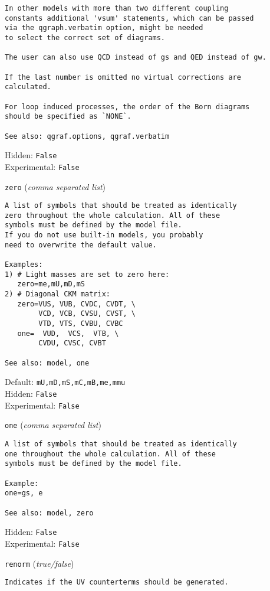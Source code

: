 \begin{basedescript}{\desclabelstyle{\pushlabel}}
\begin{verbatim}
In other models with more than two different coupling
constants additional 'vsum' statements, which can be passed
via the qgraph.verbatim option, might be needed
to select the correct set of diagrams.

The user can also use QCD instead of gs and QED instead of gw.

If the last number is omitted no virtual corrections are
calculated.

For loop induced processes, the order of the Born diagrams
should be specified as `NONE`.

See also: qgraf.options, qgraf.verbatim
\end{verbatim}
Hidden: \verb|False|
\\Experimental: \verb|False|
\\\item[\colorbox{gray!30}{\texttt{zero}}] (\textit{comma separated list})
\begin{verbatim}
A list of symbols that should be treated as identically
zero throughout the whole calculation. All of these
symbols must be defined by the model file.
If you do not use built-in models, you probably
need to overwrite the default value.

Examples:
1) # Light masses are set to zero here:
   zero=me,mU,mD,mS
2) # Diagonal CKM matrix:
   zero=VUS, VUB, CVDC, CVDT, \
        VCD, VCB, CVSU, CVST, \
        VTD, VTS, CVBU, CVBC
   one=  VUD,  VCS,  VTB, \
        CVDU, CVSC, CVBT

See also: model, one
\end{verbatim}
Default: \verb|mU,mD,mS,mC,mB,me,mmu|
\\Hidden: \verb|False|
\\Experimental: \verb|False|
\\\item[\colorbox{gray!30}{\texttt{one}}] (\textit{comma separated list})
\begin{verbatim}
A list of symbols that should be treated as identically
one throughout the whole calculation. All of these
symbols must be defined by the model file.

Example:
one=gs, e

See also: model, zero
\end{verbatim}
Hidden: \verb|False|
\\Experimental: \verb|False|
\\\item[\colorbox{gray!30}{\texttt{renorm}}] (\textit{true/false})
\begin{verbatim}
Indicates if the UV counterterms should be generated.


\end{verbatim}
\end{basedescript}

